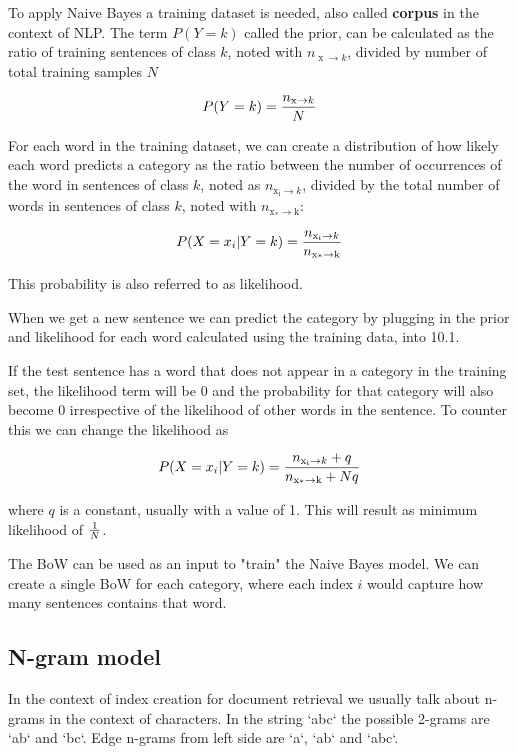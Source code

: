 To apply Naive Bayes a training dataset is needed, also called \textbf{corpus} in the context of NLP. The term \(P(Y=k)\) called the prior, can be calculated as the ratio of training sentences of class \(k\), noted with \(n_{\operatorname{x} \rightarrow k}\), divided by number of total training samples \(N\)

\[P(Y = k) = {n_{\operatorname{x} \rightarrow k} \over N}\]

For each word in the training dataset, we can create a distribution of how likely each word predicts a category as the ratio between the number of occurrences of the word in sentences of class \(k\), noted as \(n_{\operatorname{x_i} \rightarrow k}\), divided by the total number of words in sentences of class \(k\), noted with \(n_{\operatorname{x_* \rightarrow k}}\):

\[P(X = x_i | Y = k) = {n_{\operatorname{x_i} \rightarrow k} \over n_{\operatorname{x_* \rightarrow k}}}\]

This probability is also referred to as likelihood.

When we get a new sentence we can predict the category by plugging in the prior and likelihood for each word calculated using the training data, into 10.1.

If the test sentence has a word that does not appear in a category in the training set, the likelihood term will be \(0\) and the probability for that category will also become \(0\) irrespective of the likelihood of other words in the sentence. To counter this we can change the likelihood as

\[P(X = x_i | Y = k) = {n_{\operatorname{x_i} \rightarrow k} + q \over n_{\operatorname{x_* \rightarrow k}} + Nq}\]

where \(q\) is a constant, usually with a value of 1. This will result as minimum likelihood of \(1 \over N\).

The BoW can be used as an input to "train" the Naive Bayes model. We can create a single BoW for each category, where each index \(i\) would capture how many sentences contains that word.

\subsection{N-gram model}

In the context of index creation for document retrieval we usually talk about n-grams in the context of characters. In the string `abc` the possible 2-grams are `ab` and `bc`. Edge n-grams from left side are `a`, `ab` and `abc`.

